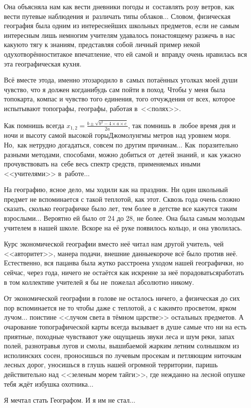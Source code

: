 Она объясняла нам как вести дневники погоды и~составлять розу ветров, как вести путевые наблюдения и~различать типы облаков$\ldots$ Словом, физическая география была одним из интереснейших школьных предметов, если не самым интересным\mdash 
лишь немногим учителям удавалось по\sdash настоящему разжечь в нас какую\sdash то тягу к знаниям, представляя собой личный пример некой одухотворённости\mdash такое впечатление, что ей самой и~вправду очень нравилась вся эта географическая кухня.

Всё вместе это\mdash да, именно это\mdash зародило в~самых потаённых уголках моей души чувство, что я должен когда\sdash нибудь сам пойти в поход. Чтобы у меня была топокарта, компас и чувство того единения, того отчуждения от всех, которое испытывают топографы, географы, работая в~<<полях>>.
 
Как помнишь всегда ${x_{1,2}= \frac{b\pm \sqrt{b^2-4\times a\times c}}{2a}}$, так помнишь в~любое время дня и ночи и высоту самой высокой горы\mdash Джомолунгмы метров над уровнем моря. Но,~как нетрудно догадаться, совсем по другим причинам$\ldots$ Как~поразительно разными методами, способами, можно добиться от~детей знаний, и~как ужасно прочувствовать на~себе весь спектр средств, применяемых иными <<учителями>> в~работе$\ldots$ 

На географию, ясное дело, мы ходили как на праздник. Ни один школьный предмет не вспоминается с такой теплотой, как этот. Сквозь года очень сложно сказать, сколько географичке было лет, тем более в детстве все кажутся таким взрослыми$\ldots$ Вероятно ей было от 24 до 28, не более. Она была самым молодым учителем в нашей школе. Вскоре на её руке появилось кольцо, и она уволилась. 

Курс экономической географии вместо неё читал нам другой учитель, чей <<авторитет>>, манера подачи, внешние данные\mdash короче всё было против неё. Естественно, вся пацанва была жутко расстроена уходом нашей географички, но сейчас, через года, ничего не остаётся как искренне за неё порадоваться\mdash работать в том коллективе учителей я бы не~пожелал абсолютно никому. 

От экономической географии в голове не осталось ничего, а физическая до сих пор вспоминается не то чтобы даже с теплотой, а с каким\sdash то просветом, ярком лучом$\ldots$ поистине <<лучом света в тёмном царстве>> остальных предметов. А очарование топографической карты всегда вызывает в душе самые что ни на есть приятные, походные чувства\mdash вот уже ощущаешь звуки леса и шум реки, запах полей, разнотравья лугов и смолы, вышибаемой жарким летним солнышком из исполинских сосен, проносишься по лучевым просекам и петляющим ниточкам лесных дорог, уносишься в глушь нашей огромной территории, паришь действительно над <<зеленым морем тайги>>, где нежданно на лесной опушке тебя ждёт избушка охотника$\ldots$

Я мечтал стать Географом. И я им не стал$\ldots$

\begin{center}
\end{center}
